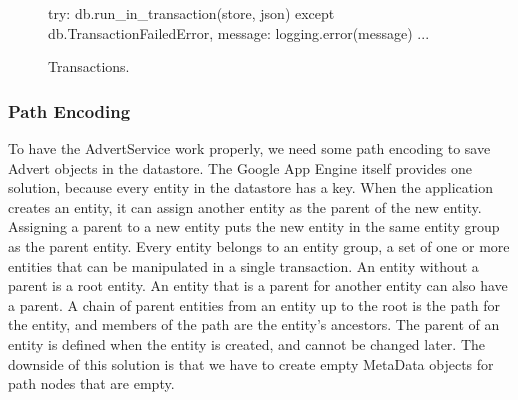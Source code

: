 \begin{figure*}[ht] %
\begin{center}
\begin{code}
try:
  db.run_in_transaction(store, json) 
except db.TransactionFailedError, message:
  logging.error(message)
  ...
\end{code}
\caption{Transactions.\label{serverimpl-transfun}}
\end{center}
\end{figure*}



\subsubsection{Path Encoding}
To have the AdvertService work properly, we need some path encoding to save
Advert objects in the datastore. The Google App Engine itself provides one
solution, because every entity in the datastore has a key. When the application
creates an entity, it can assign another entity as the parent of the new entity.
Assigning a parent to a new entity puts the new entity in the same entity group
as the parent entity. Every entity belongs to an entity group, a set of one or
more entities that can be manipulated in a single transaction. An entity without
a parent is a root entity. An entity that is a parent for another entity can also
have a parent. A chain of parent entities from an entity up to the root is the
path for the entity, and members of the path are the entity's ancestors. The
parent of an entity is defined when the entity is created, and cannot be changed
later. The downside of this solution is that we have to create empty MetaData
objects for path nodes that are empty.

